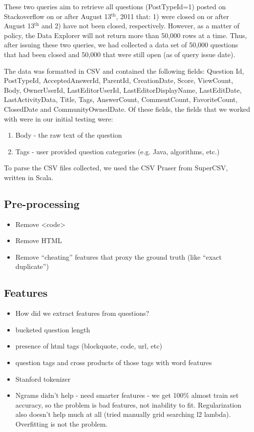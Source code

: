 \documentclass[11pt]{article}
\begin{document}
These two queries aim to retrieve all questions (PostTypeId=1) posted
on Stackoverflow on or after August 13$^{\textrm{th}}$, 2011 that: 1)
were closed on or after August 13$^{\textrm{th}}$ and 2) have not been
closed, respectively.  However, as a matter of policy, the Data
Explorer will not return more than 50,000 rows at a time.  Thus, after
issuing these two queries, we had collected a data set of 50,000
questions that had been closed and 50,000 that were still open (as of
query issue date).

The data was formatted in CSV and contained the following fields:
Question Id, PostTypeId, AcceptedAnswerId, ParentId, CreationDate,
Score, ViewCount, Body, OwnerUserId, LastEditorUserId,
LastEditorDisplayName, LastEditDate, LastActivityData, Title, Tags,
AnswerCount, CommentCount, FavoriteCount, ClosedDate and
CommunityOwnedDate. Of these fields, the fields that we worked with
were in our initial testing were:

\begin{enumerate}
  \item Body - the raw text of the question
  \item Tags - user provided question categories (e.g. Java,
    algorithms, etc.)
\end{enumerate}

To parse the CSV files collected, we used the CSV Praser from
SuperCSV, written in Scala.

\subsection{Pre-processing}
\begin{itemize}
\item Remove <code>
\item Remove HTML
\item Remove “cheating” features that proxy the ground truth (like “exact duplicate”)
\end{itemize}

\subsection{Features}
\begin{itemize}
\item How did we extract features from questions?
\item bucketed question length
\item presence of html tags (blockquote, code, url, etc)
\item question tags and cross products of those tags with word features
\item Stanford tokenizer
\item Ngrams didn’t help - need smarter features - we get 100\% almost train set accuracy, so the problem is bad features, not inability to fit. Regularization also doesn’t help much at all (tried manually grid searching l2 lambda). Overfitting is not the problem.
\end{itemize}
\end{document}
